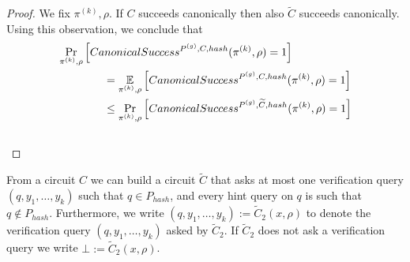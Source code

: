 %
\begin{proof}
We fix $\pi^{(k)}, \rho$.
If $C$ succeeds canonically then also $\widetilde{C}$ succeeds canonically.
Using this observation, we conclude that
\begin{align*}
  &\underset{\pi^{(k)}, \rho}{\Pr}\left[CanonicalSuccess^{P^{(g)}, C, hash}(\pi^{(k)}, \rho) = 1\right] \\
  &\mbox\qquad\qquad = \underset{\pi^{(k)}, \rho}{\mathbb{E}}\left[CanonicalSuccess^{P^{(g)}, C, hash}(\pi^{(k)}, \rho) = 1 \right] \\
  &\mbox\qquad\qquad \leq \underset{\pi^{(k)}, \rho}{\Pr}\left[CanonicalSuccess^{P^{(g)}, \widetilde{C}, hash}(\pi^{(k)}, \rho) = 1\right]
\end{align*}
\\\text{  }
\end{proof}
%
From a circuit $C$ we can build a circuit $\widetilde{C}$ that asks at most one verification query
$(q, y_1, \dots, y_k)$ such that $q \in P_{hash}$, and every hint query on $q$ is such that $q \notin P_{hash}$.
Furthermore, we write $(q, y_1, \dots, y_k) := \widetilde{C}_2(x, \rho)$ to denote
the verification query $(q, y_1, \dots, y_k)$ asked by $\widetilde{C}_2$.
If $\widetilde{C}_2$ does not ask a verification query we write $\bot := \widetilde{C}_2(x, \rho)$.
%
%
